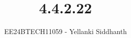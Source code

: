 \documentclass[journal]{IEEEtran}
\begin{document}
	
	
	\vspace{3cm}
	
	\title{4.4.2.22}
	\author{EE24BTECH11059 - Yellanki Siddhanth
	}
	{\let\newpage\relax\maketitle}
	
	\renewcommand{\thefigure}{\theenumi}
	\renewcommand{\thetable}{\theenumi}
	\setlength{\intextsep}{10pt} %
	
	
	\renewcommand{\thetable}{\theenumi}
	
\end{document}
